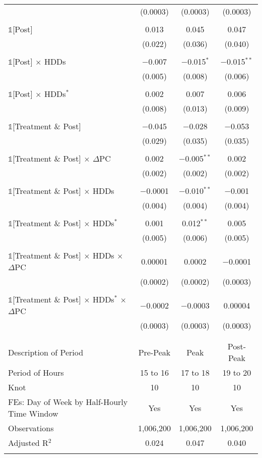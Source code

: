 \begin{table}[!htbp]
\begin{tabular}{@{\extracolsep{95pt}}lccc}
  & (0.0003) & (0.0003) & (0.0003) \\ 
  & & & \\ 
 $\mathbb{1}$[Post] & 0.013 & 0.045 & 0.047 \\ 
  & (0.022) & (0.036) & (0.040) \\ 
  & & & \\ 
 $\mathbb{1}$[Post] $\times$ HDDs & $-$0.007 & $-$0.015$^{*}$ & $-$0.015$^{**}$ \\ 
  & (0.005) & (0.008) & (0.006) \\ 
  & & & \\ 
 $\mathbb{1}$[Post] $\times$ HDDs$^{*}$ & 0.002 & 0.007 & 0.006 \\ 
  & (0.008) & (0.013) & (0.009) \\ 
  & & & \\ 
 $\mathbb{1}$[Treatment \& Post] & $-$0.045 & $-$0.028 & $-$0.053 \\ 
  & (0.029) & (0.035) & (0.035) \\ 
  & & & \\ 
 $\mathbb{1}$[Treatment \& Post] $\times$ $\Delta$PC & 0.002 & $-$0.005$^{**}$ & 0.002 \\ 
  & (0.002) & (0.002) & (0.002) \\ 
  & & & \\ 
 $\mathbb{1}$[Treatment \& Post] $\times$ HDDs & $-$0.0001 & $-$0.010$^{**}$ & $-$0.001 \\ 
  & (0.004) & (0.004) & (0.004) \\ 
  & & & \\ 
 $\mathbb{1}$[Treatment \& Post] $\times$ HDDs$^{*}$ & 0.001 & 0.012$^{**}$ & 0.005 \\ 
  & (0.005) & (0.006) & (0.005) \\ 
  & & & \\ 
 $\mathbb{1}$[Treatment \& Post] $\times$ HDDs $\times$ $\Delta$PC & 0.00001 & 0.0002 & $-$0.0001 \\ 
  & (0.0002) & (0.0002) & (0.0003) \\ 
  & & & \\ 
 $\mathbb{1}$[Treatment \& Post] $\times$ HDDs$^{*}$ $\times$ $\Delta$PC & $-$0.0002 & $-$0.0003 & 0.00004 \\ 
  & (0.0003) & (0.0003) & (0.0003) \\ 
  & & & \\ 
\hline \\[-1.8ex] 
Description of Period & Pre-Peak & Peak & Post-Peak \\ 
Period of Hours & 15 to 16 & 17 to 18 & 19 to 20 \\ 
Knot & 10 & 10 & 10 \\ 
FEs: Day of Week by Half-Hourly Time Window & Yes & Yes & Yes \\ 
Observations & 1,006,200 & 1,006,200 & 1,006,200 \\ 
Adjusted R$^{2}$ & 0.024 & 0.047 & 0.040 \\ 
\hline 
\hline \\[-1.8ex] 
\end{tabular} 
\end{table} 
